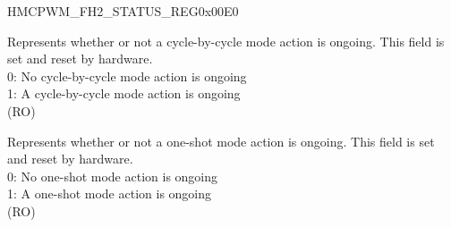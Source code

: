\begin{register}{H}{MCPWM\_FH2\_STATUS\_REG}{0x00E0}\label{regdesc:MCPWMFH2STATUSREG}
%
%
%
\regnewline%
\begin{regdesc}\begin{reglist}
\label{fielddesc:MCPWMFH2CBCON}\item [MCPWM\_FH2\_CBC\_ON] Represents whether or not a cycle-by-cycle mode action is ongoing. This field is set and reset by hardware.\\
0: No cycle-by-cycle mode action is ongoing\\
1: A cycle-by-cycle mode action is ongoing\\
(RO)
\label{fielddesc:MCPWMFH2OSTON}\item [MCPWM\_FH2\_OST\_ON] Represents whether or not a one-shot mode action is ongoing. This field is set and reset by hardware.\\
0: No one-shot mode action is ongoing\\
1: A one-shot mode action is ongoing\\
(RO)
\end{reglist}\end{regdesc}
\end{register}


